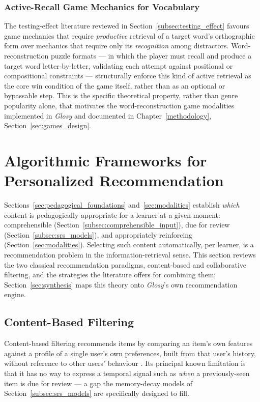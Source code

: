         \subsubsection{Active-Recall Game Mechanics for Vocabulary}
        \label{subsubsec:active_recall_games}
        The testing-effect literature reviewed in Section~\ref{subsec:testing_effect} \cite{roediger2006testing} favours game mechanics that require \emph{productive} retrieval of a target word's orthographic form over mechanics that require only its \emph{recognition} among distractors. Word-reconstruction puzzle formats --- in which the player must recall and produce a target word letter-by-letter, validating each attempt against positional or compositional constraints --- structurally enforce this kind of active retrieval as the core win condition of the game itself, rather than as an optional or bypassable step. This is the specific theoretical property, rather than genre popularity alone, that motivates the word-reconstruction game modalities implemented in \textit{Glosy} and documented in Chapter~\ref{methodology}, Section~\ref{sec:games_design}.


\section{Algorithmic Frameworks for Personalized Recommendation}
\label{sec:recommendation_algorithms}

    Sections~\ref{sec:pedagogical_foundations} and~\ref{sec:modalities} establish \emph{which} content is pedagogically appropriate for a learner at a given moment: comprehensible (Section~\ref{subsec:comprehensible_input}), due for review (Section~\ref{subsec:srs_models}), and appropriately reinforcing (Section~\ref{sec:modalities}). Selecting such content automatically, per learner, is a recommendation problem in the information-retrieval sense. This section reviews the two classical recommendation paradigms, content-based and collaborative filtering, and the strategies the literature offers for combining them; Section~\ref{sec:synthesis} maps this theory onto \textit{Glosy}'s own recommendation engine.

    \subsection{Content-Based Filtering}
    \label{subsec:content_based_filtering}
    Content-based filtering recommends items by comparing an item's own features against a profile of a single user's own preferences, built from that user's history, without reference to other users' behaviour \cite{adomavicius2005toward}. Its principal known limitation is that it has no way to express a temporal signal such as \emph{when} a previously-seen item is due for review \cite{adomavicius2005toward} --- a gap the memory-decay models of Section~\ref{subsec:srs_models} are specifically designed to fill.

